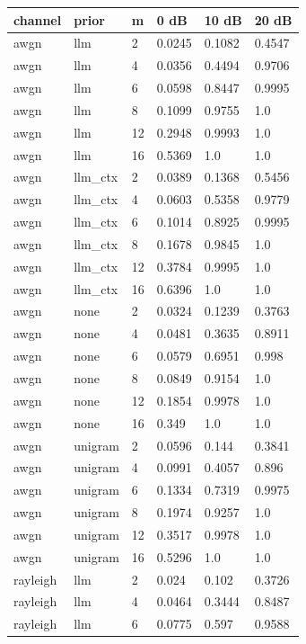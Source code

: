 \begin{tabular}{llllll}
\hline
channel & prior & m & 0 dB & 10 dB & 20 dB \\
\hline
awgn & llm & 2 & 0.0245 & 0.1082 & 0.4547 \\
awgn & llm & 4 & 0.0356 & 0.4494 & 0.9706 \\
awgn & llm & 6 & 0.0598 & 0.8447 & 0.9995 \\
awgn & llm & 8 & 0.1099 & 0.9755 & 1.0 \\
awgn & llm & 12 & 0.2948 & 0.9993 & 1.0 \\
awgn & llm & 16 & 0.5369 & 1.0 & 1.0 \\
awgn & llm\_ctx & 2 & 0.0389 & 0.1368 & 0.5456 \\
awgn & llm\_ctx & 4 & 0.0603 & 0.5358 & 0.9779 \\
awgn & llm\_ctx & 6 & 0.1014 & 0.8925 & 0.9995 \\
awgn & llm\_ctx & 8 & 0.1678 & 0.9845 & 1.0 \\
awgn & llm\_ctx & 12 & 0.3784 & 0.9995 & 1.0 \\
awgn & llm\_ctx & 16 & 0.6396 & 1.0 & 1.0 \\
awgn & none & 2 & 0.0324 & 0.1239 & 0.3763 \\
awgn & none & 4 & 0.0481 & 0.3635 & 0.8911 \\
awgn & none & 6 & 0.0579 & 0.6951 & 0.998 \\
awgn & none & 8 & 0.0849 & 0.9154 & 1.0 \\
awgn & none & 12 & 0.1854 & 0.9978 & 1.0 \\
awgn & none & 16 & 0.349 & 1.0 & 1.0 \\
awgn & unigram & 2 & 0.0596 & 0.144 & 0.3841 \\
awgn & unigram & 4 & 0.0991 & 0.4057 & 0.896 \\
awgn & unigram & 6 & 0.1334 & 0.7319 & 0.9975 \\
awgn & unigram & 8 & 0.1974 & 0.9257 & 1.0 \\
awgn & unigram & 12 & 0.3517 & 0.9978 & 1.0 \\
awgn & unigram & 16 & 0.5296 & 1.0 & 1.0 \\
rayleigh & llm & 2 & 0.024 & 0.102 & 0.3726 \\
rayleigh & llm & 4 & 0.0464 & 0.3444 & 0.8487 \\
rayleigh & llm & 6 & 0.0775 & 0.597 & 0.9588 \\

\end{tabular}
